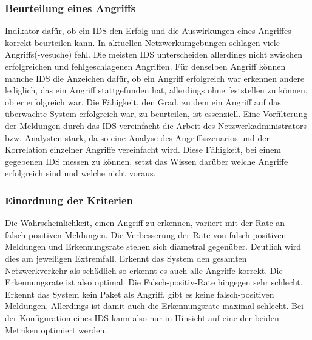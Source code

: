 \subsubsection{Beurteilung  eines Angriffs}
Indikator dafür, ob ein IDS den Erfolg und die Auswirkungen eines Angriffes korrekt beurteilen kann. In aktuellen Netzwerkumgebungen schlagen viele Angriffs(-vesuche) fehl. Die meisten IDS unterscheiden allerdings nicht zwischen erfolgreichen und fehlgeschlagenen Angriffen. Für denselben Angriff können manche IDS die Anzeichen dafür, ob ein Angriff erfolgreich war erkennen andere lediglich, das ein Angriff stattgefunden hat, allerdings ohne feststellen zu können, ob er erfolgreich war. Die Fähigkeit, den Grad, zu dem ein Angriff auf das überwachte System erfolgreich war, zu beurteilen, ist essenziell. Eine Vorfilterung der Meldungen durch das IDS vereinfacht die Arbeit des Netzwerkadministrators bzw. Analysten stark, da so eine Analyse des Angriffsszenarios und der Korrelation einzelner Angriffe vereinfacht wird. Diese Fähigkeit, bei einem gegebenen IDS messen zu können, setzt das Wissen darüber welche Angriffe erfolgreich sind und welche nicht voraus.


\subsubsection{Einordnung der Kriterien}
Die Wahrscheinlichkeit, einen Angriff zu erkennen, variiert mit der Rate an falsch-positiven Meldungen. Die Verbesserung der Rate von falsch-positiven Meldungen und Erkennungsrate stehen sich diametral gegenüber. Deutlich wird dies am jeweiligen Extremfall. Erkennt das System den gesamten Netzwerkverkehr als schädlich so erkennt es auch alle Angriffe korrekt. Die Erkennungsrate ist also optimal. Die Falsch-positiv-Rate hingegen sehr schlecht. Erkennt das System kein Paket als Angriff, gibt es keine falsch-positiven Meldungen. Allerdings ist damit auch die Erkennungsrate maximal schlecht. Bei der Konfiguration eines IDS kann also nur in Hinsicht auf eine der beiden Metriken optimiert werden.

